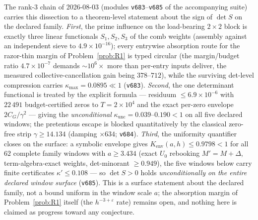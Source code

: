 \documentclass[11pt,a4paper]{article}
\theoremstyle{plain}
\theoremstyle{definition}
\begin{document}
The rank-3 chain of 2026-08-03 (modules \texttt{v683}--\texttt{v685} of the
accompanying suite) carries this dissection to a theorem-level statement about
the sign of $\det S$ on the declared family.  \emph{First}, the prime influence
on the load-bearing $2\times2$ block is exactly three linear functionals
$S_1,S_2,S_3$ of the comb weights (assembly against an independent sieve to
$4.9\times10^{-16}$); every entrywise absorption route for the razor-thin
margin of Problem~\ref{prob:R1} is typed circular (the margin/budget ratio
$4.7\times10^{-7}$ demands ${\sim}10^{6}\times$ more than per-entry inputs
deliver, the measured collective-cancellation gain being $378$--$712$),
while the surviving det-level compression carries $\kappa_{\max}=0.0895\ll1$
(\texttt{v683}).  \emph{Second}, the one determinant functional is treated by
the explicit formula --- residuum $\le6.9\times10^{-6}$ with $22\,491$
budget-certified zeros to $T=2\times10^{4}$ and the exact per-zero envelope
$2C_G/\gamma^2$ --- giving the \emph{unconditional}
$\kappa_{\mathrm{unc}}=0.039$--$0.190<1$ on all five declared windows; the
pretentious escape is blocked quantitatively by the classical zero-free strip
$\gamma\ge14.134$ (damping $\times634$; \texttt{v684}).  \emph{Third}, the
uniformity quantifier closes on the surface: a symbolic envelope gives
$K_{\mathrm{env}}(a,h)\le0.9798<1$ for all $62$ complete family windows with
$a\ge3.434$ (exact $U_0$ rebooking $M'=M+\Delta$, term-algebra-exact weights,
det-minorant $\ge0.949$), the five windows below carry finite certificates
$\kappa'\le0.108$ --- so $\det S>0$ holds \emph{unconditionally on the entire
declared window surface} (\texttt{v685}).  This is a surface statement about
the declared family, not a bound uniform in the window scale $a$; the
absorption margin of Problem~\ref{prob:R1} itself (the $h^{-3+\varepsilon}$
rate) remains open, and nothing here is claimed as progress toward any
conjecture.
\end{document}
